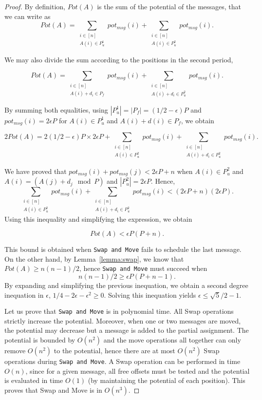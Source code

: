 \documentclass[a4paper,UKenglish,cleveref, autoref, thm-restate]{lipics-v2019}
\newcommand\swapandmove{\texttt{Swap and Move}\xspace}
\begin{document}
\begin{proof}
By definition, $Pot(A)$ is the sum of the potential of the messages, that we can write as 
$$Pot(A) = \sum_{\substack{i \in [n] \\ A(i) \in P^1_u} } pot_{msg}(i) + \sum_{\substack{i \in [n] \\ A(i) \in P^2_u} } pot_{msg}(i).$$

We may also divide the sum according to the positions in the second period,

$$Pot(A) = \sum_{\substack{i \in [n] \\ A(i) + d_i \in P_f} } pot_{msg}(i) + \sum_{\substack{i \in [n] \\ A(i) + d_i \in P^2_u} } pot_{msg}(i).$$

By summing both equalities, using $|P^1_u| = |P_f| = (1/2 - \epsilon)P$ and 
$pot_{msg}(i) = 2\epsilon P$ for $A(i) \in P^1_u$ and  $A(i) + d(i) \in P_f$, we obtain  


$$2Pot(A) = 2(1/2 - \epsilon)P \times 2\epsilon P + \sum_{\substack{i \in [n] \\ A(i) \in P^2_u} } pot_{msg}(i) + \sum_{\substack{i \in [n] \\ A(i) + d_i \in P^2_u} } pot_{msg}(i).$$


We have proved that $pot_{msg}(i) + pot_{msg}(j) < 2\epsilon P + n$ when $A(i) \in P^2_u$ and $A(i) = (A(j) + d_j \mod P)$ and  $|P^2_u| = 2\epsilon P$.
Hence, $$\sum_{\substack{i \in [n] \\ A(i) \in P^2_u} } pot_{msg}(i) + \sum_{\substack{i \in [n] \\ A(i) + d_i \in P^2_u} } pot_{msg}(i) < (2\epsilon P + n)(2\epsilon P).$$
Using this inequality and simplifying the expression, we obtain 


$$  Pot(A) < \epsilon P (P + n).$$

This bound is obtained when \swapandmove fails to schedule the last message.
On the other hand, by Lemma~\ref{lemma:swap}, we know that $Pot(A) \geq n(n-1)/2$, hence 
\swapandmove must succeed when
$$n(n-1)/2 \geq  \epsilon P (P + n -1).$$
By expanding and simplifying the previous inequation, we obtain a second degree inequation in $\epsilon$, $1/4 - 2\epsilon - \epsilon ^2 \geq  0$.
Solving this inequation yields $\epsilon \leq \sqrt{5}/2 -1$.


Let us prove that \swapandmove is in polynomial time. All Swap operations 
strictly increase the potential. Moreover, when one or two messages are moved, the potential may decrease but
a message is added to the partial assignment. The potential is bounded by $O(n^2)$ and the move operations all together can only remove $O(n^2)$ to the potential, hence there are at most $O(n^2)$ Swap operations during \swapandmove. A Swap operation can be performed in time $O(n)$, since for a given message, all free offsets must be tested and the potential is evaluated in time $O(1)$ (by maintaining the potential of each position). This proves that Swap and Move is in $O(n^3)$.  
\end{proof}
\end{document}
